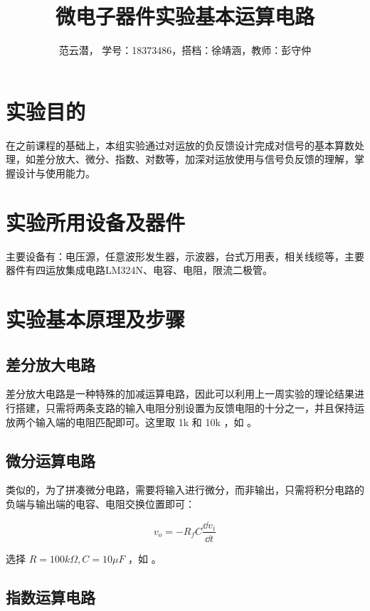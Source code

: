 \documentclass[lang=cn,11pt,a4paper,cite=authoryear]{elegantpaper}
\title{微电子器件实验\quad 基本运算电路}
\author{范云潜， 学号：18373486，搭档：徐靖涵，教师：彭守仲}
\institute{微电子学院 184111 班}
\date{\zhtoday}
\begin{document}
\maketitle


\section{实验目的}

在之前课程的基础上，本组实验通过对运放的负反馈设计完成对信号的基本算数处理，如差分放大、微分、指数、对数等，加深对运放使用与信号负反馈的理解，掌握设计与使用能力。

\section{实验所用设备及器件}


主要设备有：电压源，任意波形发生器，示波器，台式万用表，相关线缆等，主要器件有四运放集成电路LM324N、电容、电阻，限流二极管。

\section{实验基本原理及步骤}

\subsection{差分放大电路}

差分放大电路是一种特殊的加减运算电路，因此可以利用上一周实验的理论结果进行搭建，只需将两条支路的输入电阻分别设置为反馈电阻的十分之一，并且保持运放两个输入端的电阻匹配即可。这里取 1k 和 10k ，如  。


\subsection{微分运算电路}

类似的，为了拼凑微分电路，需要将输入进行微分，而非输出，只需将积分电路的负端与输出端的电容、电阻交换位置即可：

\[v_o =  - R_f C \dfrac{\dd{v_i}}{\dd{t}}\]

选择 \(R = 100k \Omega, C = 10 \mu F\) ，如  。


\subsection{指数运算电路}
\end{document}
